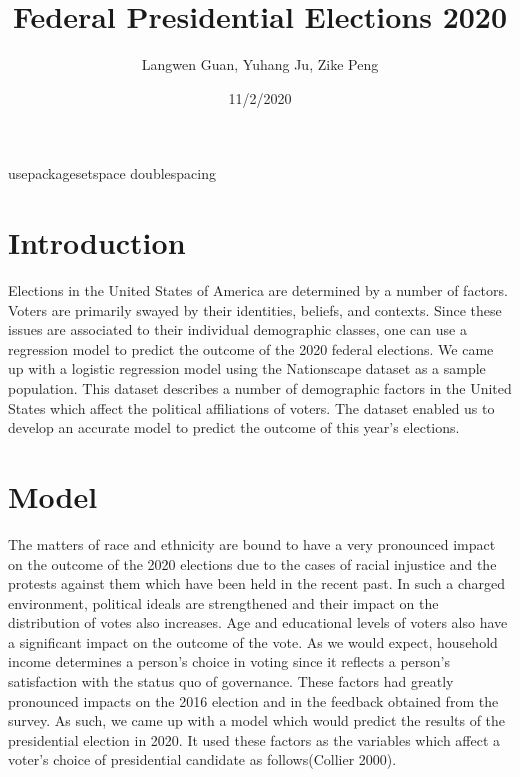 \documentclass[
  12pt,
]{article}
\begin{document}
usepackage{setspace} doublespacing


\title{Federal Presidential Elections 2020}
\author{Langwen Guan, Yuhang Ju, Zike Peng}
\date{11/2/2020}

\maketitle

\newpage

\hypertarget{introduction}{%
\section{Introduction}\label{introduction}}

Elections in the United States of America are determined by a number of
factors. Voters are primarily swayed by their identities, beliefs, and
contexts. Since these issues are associated to their individual
demographic classes, one can use a regression model to predict the
outcome of the 2020 federal elections. We came up with a logistic
regression model using the Nationscape dataset as a sample population.
This dataset describes a number of demographic factors in the United
States which affect the political affiliations of voters. The dataset
enabled us to develop an accurate model to predict the outcome of this
year's elections.

\hypertarget{model}{%
\section{Model}\label{model}}

The matters of race and ethnicity are bound to have a very pronounced
impact on the outcome of the 2020 elections due to the cases of racial
injustice and the protests against them which have been held in the
recent past. In such a charged environment, political ideals are
strengthened and their impact on the distribution of votes also
increases. Age and educational levels of voters also have a significant
impact on the outcome of the vote. As we would expect, household income
determines a person's choice in voting since it reflects a person's
satisfaction with the status quo of governance. These factors had
greatly pronounced impacts on the 2016 election and in the feedback
obtained from the survey. As such, we came up with a model which would
predict the results of the presidential election in 2020. It used these
factors as the variables which affect a voter's choice of presidential
candidate as follows(Collier 2000).
\end{document}
